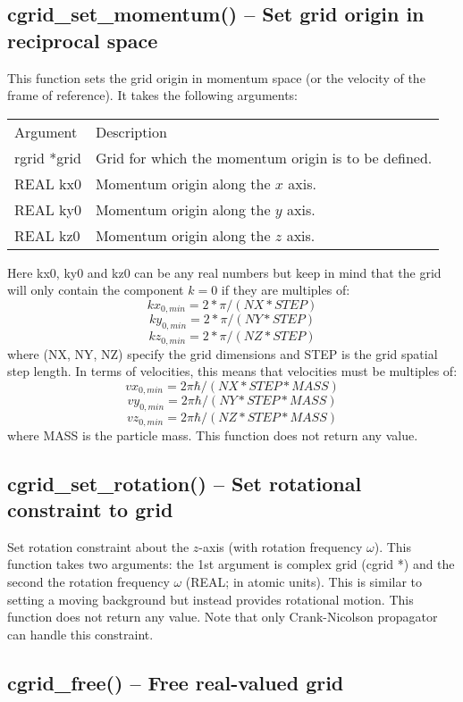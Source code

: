 \documentclass[12pt,letterpaper]{report}
\begin{document}
\subsection{cgrid\_set\_momentum() -- Set grid origin in reciprocal space}

This function sets the grid origin in momentum space (or the velocity of the frame of reference). It takes the following arguments:
\begin{longtable}{p{} p{}}
Argument & Description\\
\cline{1-2}
rgrid *grid & Grid for which the momentum origin is to be defined.\\
REAL kx0 & Momentum origin along the $x$ axis.\\
REAL ky0 & Momentum origin along the $y$ axis.\\
REAL kz0 & Momentum origin along the $z$ axis.\\
\end{longtable}
\noindent
Here kx0, ky0 and kz0 can be any real numbers but keep in mind that the grid will only contain the component $k = 0$ if they are multiples of:
$$kx_{0,min} = 2 * \pi / (NX * STEP)$$
$$ky_{0,min} = 2 * \pi / (NY * STEP)$$
$$kz_{0,min} = 2 * \pi / (NZ * STEP)$$
\noindent
where (NX, NY, NZ) specify the grid dimensions and STEP is the grid spatial step length. In terms of velocities, this means that velocities must be multiples of:
$$vx_{0,min} = 2\pi\hbar / (NX * STEP * MASS)$$
$$vy_{0,min} = 2\pi\hbar / (NY * STEP * MASS)$$
$$vz_{0,min} = 2\pi\hbar / (NZ * STEP * MASS)$$
where MASS is the particle mass. This function does not return any value.

\subsection{cgrid\_set\_rotation() -- Set rotational constraint to grid}

Set rotation constraint about the $z$-axis (with rotation frequency $\omega$). This function takes two arguments: the 1st argument is complex grid (cgrid *) and the second the rotation frequency $\omega$ (REAL; in atomic units). This is similar to setting a moving background but instead provides rotational motion. This function does not return any value. Note that only Crank-Nicolson propagator can handle this constraint.

\subsection{cgrid\_free() -- Free real-valued grid}
\end{document}
